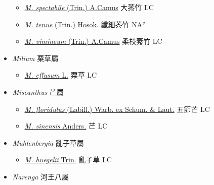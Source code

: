 \begin{itemize}
\begin{itemize}
        \item[] \href{http://www.theplantlist.org/tpl1.1/search?q=Microstegium+spectabile}{\textit{M. spectabile} (Trin.) A.Camus}   大莠竹 LC
        \item[] \href{http://www.theplantlist.org/tpl1.1/search?q=Microstegium+tenue}{\textit{M. tenue} (Trin.) Hosok.}   纖細莠竹 NA$^v$
        \item[] \href{http://www.theplantlist.org/tpl1.1/search?q=Microstegium+vimineum}{\textit{M. vimineum} (Trin.) A.Camus}   柔枝莠竹 LC
  \end{itemize}
 \item[] \textit{Milium} 粟草屬
                    
  \begin{itemize}
        \item[] \href{http://www.theplantlist.org/tpl1.1/search?q=Milium+effusum}{\textit{M. effusum} L.}   粟草 LC
  \end{itemize}
 \item[] \textit{Miscanthus} 芒屬
                    
  \begin{itemize}
        \item[] \href{http://www.theplantlist.org/tpl1.1/search?q=Miscanthus+floridulus}{\textit{M. floridulus} (Labill.) Warb. ex Schum. \& Laut.}   五節芒 LC
        \item[] \href{http://www.theplantlist.org/tpl1.1/search?q=Miscanthus+sinensis}{\textit{M. sinensis} Anders.}   芒 LC
  \end{itemize}
 \item[] \textit{Muhlenbergia} 亂子草屬
                    
  \begin{itemize}
        \item[] \href{http://www.theplantlist.org/tpl1.1/search?q=Muhlenbergia+huegelii}{\textit{M. huegelii} Trin.}   亂子草 LC
  \end{itemize}
 \item[] \textit{Narenga} 河王八屬
                    

\end{itemize}
